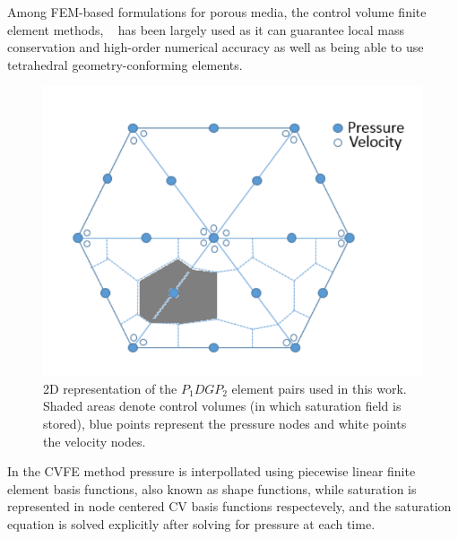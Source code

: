\documentclass[preprint,authoryear,12pt]{elsarticle}
\begin{document}
\medskip
Among FEM-based formulations for porous media, the control volume finite element methods, ~\citep[CVFEM,][]{fung_1992} has been largely used as it can guarantee local mass conservation and high-order numerical accuracy as well as being able to use tetrahedral geometry-conforming elements. 


\begin{figure}[h]
\centering
\includegraphics[width=.5\textwidth]{./Pics/P1DGP2.pdf}
\caption{2D representation of the $P_{1}DGP_{2}$ element pairs used in this work. Shaded areas denote control volumes (in which saturation field is stored), blue points represent the pressure nodes and white points the velocity nodes.}
\label{fig:fem_cv}
\end{figure}

\medskip
In the CVFE method pressure is interpollated using piecewise linear finite element basis functions, also known as shape functions, %
while saturation is represented in node centered CV basis functions respectevely, and the saturation equation is solved explicitly after solving for pressure at each time.

\end{document}
